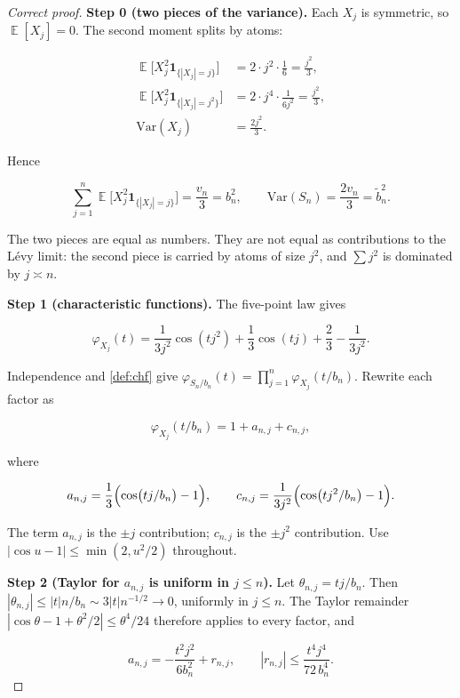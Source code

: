 \documentclass[11pt,a4paper]{article}
\DeclareMathOperator{\E}{\mathbb{E}}
\begin{document}
\begin{proof}[Correct proof]
\textbf{Step 0 (two pieces of the variance).}
Each \(X_{j}\) is symmetric, so \(\E[X_{j}]=0\). The second moment splits by atoms:

\[
\begin{aligned}
\E\bigl[X_{j}^{2}\mathbf{1}_{\{|X_{j}|=j\}}\bigr]
&=
2\cdot j^{2}\cdot\frac16
=
\frac{j^{2}}{3},
\\
\E\bigl[X_{j}^{2}\mathbf{1}_{\{|X_{j}|=j^{2}\}}\bigr]
&=
2\cdot j^{4}\cdot\frac{1}{6j^{2}}
=
\frac{j^{2}}{3},
\\
\mathrm{Var}(X_{j})
&=
\frac{2j^{2}}{3}.
\end{aligned}
\]

Hence

\[
\sum_{j=1}^{n}\E\bigl[X_{j}^{2}\mathbf{1}_{\{|X_{j}|=j\}}\bigr]
=
\frac{v_{n}}{3}
=
b_{n}^{2},
\qquad
\mathrm{Var}(S_{n})
=
\frac{2v_{n}}{3}
=
\tilde{b}_{n}^{2}.
\]

The two pieces are equal as numbers. They are not equal as contributions to the Lévy limit: the second piece is carried by atoms of size \(j^{2}\), and \(\sum j^{2}\) is dominated by \(j\asymp n\).

\textbf{Step 1 (characteristic functions).}
The five-point law gives

\[
\varphi_{X_{j}}(t)
=
\frac{1}{3j^{2}}\cos(tj^{2})
+
\frac13\cos(tj)
+
\frac23
-
\frac{1}{3j^{2}}.
\]

Independence and \cref{def:chf} give \(\varphi_{S_{n}/b_{n}}(t)=\prod_{j=1}^{n}\varphi_{X_{j}}(t/b_{n})\). Rewrite each factor as

\[
\varphi_{X_{j}}(t/b_{n})
=
1+a_{n,j}+c_{n,j},
\]

where

\[
a_{n,j}
=
\frac13\Bigl(\cos\bigl(tj/b_{n}\bigr)-1\Bigr),
\qquad
c_{n,j}
=
\frac{1}{3j^{2}}\Bigl(\cos\bigl(tj^{2}/b_{n}\bigr)-1\Bigr).
\]

The term \(a_{n,j}\) is the \(\pm j\) contribution; \(c_{n,j}\) is the \(\pm j^{2}\) contribution. Use \(|\cos u-1|\le\min(2,u^{2}/2)\) throughout.

\textbf{Step 2 (Taylor for \(a_{n,j}\) is uniform in \(j\le n\)).}
Let \(\theta_{n,j}=tj/b_{n}\). Then \(|\theta_{n,j}|\le |t|n/b_{n}\sim 3|t|n^{-1/2}\to 0\), uniformly in \(j\le n\). The Taylor remainder \(|\cos\theta-1+\theta^{2}/2|\le\theta^{4}/24\) therefore applies to every factor, and

\[
a_{n,j}
=
-\frac{t^{2}j^{2}}{6b_{n}^{2}}
+
r_{n,j},
\qquad
|r_{n,j}|
\le
\frac{t^{4}j^{4}}{72\,b_{n}^{4}}.
\]


\end{proof}
\end{document}
